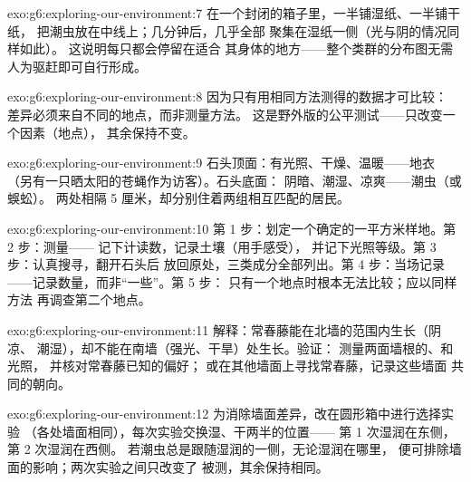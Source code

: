 \begin{solution}{exo:g6:exploring-our-environment:7}
在一个封闭的箱子里，一半铺湿纸、一半铺干纸，
把潮虫放在中线上；几分钟后，几乎全部
聚集在湿纸一侧（光与阴的情况同样如此）。
这说明每只都会停留在适合
其身体的地方——整个类群的分布图无需人为驱赶即可自行形成。
\end{solution}

\begin{solution}{exo:g6:exploring-our-environment:8}
因为只有用相同方法测得的数据才可比较：
差异必须来自不同的地点，而非测量方法。
这是野外版的公平测试——只改变一个因素（地点），
其余保持不变。
\end{solution}

\begin{solution}{exo:g6:exploring-our-environment:9}
石头顶面：有光照、干燥、温暖——地衣
（另有一只晒太阳的苍蝇作为访客）。石头底面：
阴暗、潮湿、凉爽——潮虫（或蜈蚣）。
两处相隔 5 厘米，却分别住着两组相互匹配的居民。
\end{solution}

\begin{solution}{exo:g6:exploring-our-environment:10}
第 1 步：划定一个确定的一平方米样地。第 2 步：测量——
记下计读数，记录土壤（用手感受），
并记下光照等级。第 3 步：认真搜寻，翻开石头后
放回原处，三类成分全部列出。第
4 步：当场记录——记录数量，而非“一些”。第 5 步：
只有一个地点时根本无法比较；应以同样方法
再调查第二个地点。
\end{solution}

\begin{solution}{exo:g6:exploring-our-environment:11}
解释：常春藤能在北墙的范围内生长（阴凉、
潮湿），却不能在南墙（强光、干旱）处生长。验证：
测量两面墙根的、和光照，
并核对常春藤已知的偏好；
或在其他墙面上寻找常春藤，记录这些墙面
共同的朝向。
\end{solution}

\begin{solution}{exo:g6:exploring-our-environment:12}
为消除墙面差异，改在圆形箱中进行选择实验
（各处墙面相同），每次实验交换湿、干两半的位置——
第 1 次湿润在东侧，第 2 次湿润在西侧。
若潮虫总是跟随湿润的一侧，无论湿润在哪里，
便可排除墙面的影响；两次实验之间只改变了
被测，其余保持相同。
\end{solution}

